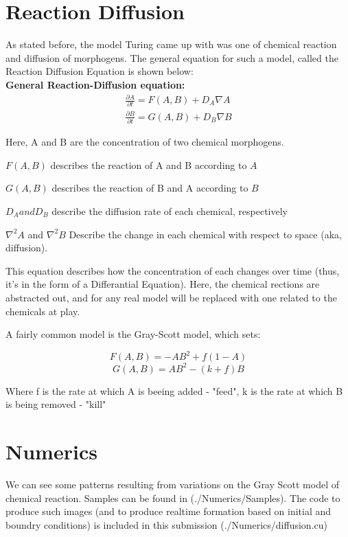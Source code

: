 \documentclass[12pt,a4paper]{amsart}
\numberwithin{equation}{section}
\theoremstyle{plain}
\theoremstyle{definition}
\begin{document}
\section{Reaction Diffusion}

As stated before, the model Turing came up with was one of chemical reaction and diffusion of morphogens.
The general equation for such a model, called the Reaction Diffusion Equation is shown below:
\\
\textbf{General Reaction-Diffusion equation:}
\begin{align*}
  \frac{\partial A}{\partial t} = F(A,B) + D_{A} \nabla A \\
  \frac{\partial B}{\partial t} = G(A,B) + D_{B} \nabla B
\end{align*}

Here, A and B are the concentration of two chemical morphogens.

$F(A,B)$ describes the reaction of A and B according to $A$

$G(A,B)$ describes the reaction of B and A according to $B$

$D_{A} and D_{B}$ describe the diffusion rate of each chemical, respectively

$\nabla^2 A$ and $\nabla^2 B$ Describe the change in each chemical with respect to space (aka, diffusion).

This equation describes how the concentration of each changes over time (thus, it's in the form of a Differantial Equation).
Here, the chemical rections are abstracted out, and for any real model will be replaced with one related to the chemicals at play.

A fairly common model is the Gray-Scott model, which sets:

$$F(A,B)=-AB^2+f(1-A)$$
$$G(A,B)=AB^2-(k+f)B$$

Where f is the rate at which A is beeing added - "feed", k is the rate at which B is being removed - "kill"

\section{Numerics}
We can see some patterns resulting from variations on the Gray Scott model of chemical reaction.
Samples can be found in (./Numerics/Samples).
The code to produce such images (and to produce realtime formation based on initial and boundry conditions)
is included in this submission (./Numerics/diffusion.cu)
\end{document}
